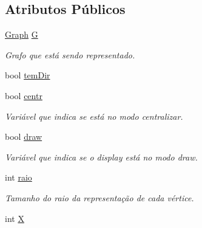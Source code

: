 \subsection*{Atributos Públicos}
\begin{DoxyCompactItemize}
\item 
\mbox{\label{classGraphDisplay_acfb839eaef7974c684794a3d5d69c79a}} 
\hyperlink{classGraph}{Graph} \hyperlink{classGraphDisplay_acfb839eaef7974c684794a3d5d69c79a}{G}
\begin{DoxyCompactList}\small\item\em Grafo que está sendo representado. \end{DoxyCompactList}\item 
bool \hyperlink{classGraphDisplay_a9d9f390d193fda9a5503b7629fd50bf3}{tem\+Dir}
\item 
\mbox{\label{classGraphDisplay_a15611d65df010f7ec38c07d1a7db525e}} 
bool \hyperlink{classGraphDisplay_a15611d65df010f7ec38c07d1a7db525e}{centr}
\begin{DoxyCompactList}\small\item\em Variável que indica se está no modo \textquotesingle{}centralizar\textquotesingle{}. \end{DoxyCompactList}\item 
\mbox{\label{classGraphDisplay_ae3f92d7ff79660d81ac0edf3c04365b1}} 
bool \hyperlink{classGraphDisplay_ae3f92d7ff79660d81ac0edf3c04365b1}{draw}
\begin{DoxyCompactList}\small\item\em Variável que indica se o display está no modo \textquotesingle{}draw\textquotesingle{}. \end{DoxyCompactList}\item 
\mbox{\label{classGraphDisplay_acb515993d45bb40131c1057a21151310}} 
int \hyperlink{classGraphDisplay_acb515993d45bb40131c1057a21151310}{raio}
\begin{DoxyCompactList}\small\item\em Tamanho do raio da representação de cada vértice. \end{DoxyCompactList}\item 
\mbox{\label{classGraphDisplay_abcaa65d083c953adc21017aa1df335ce}} 
int \hyperlink{classGraphDisplay_abcaa65d083c953adc21017aa1df335ce}{X}

\end{DoxyCompactItemize}
